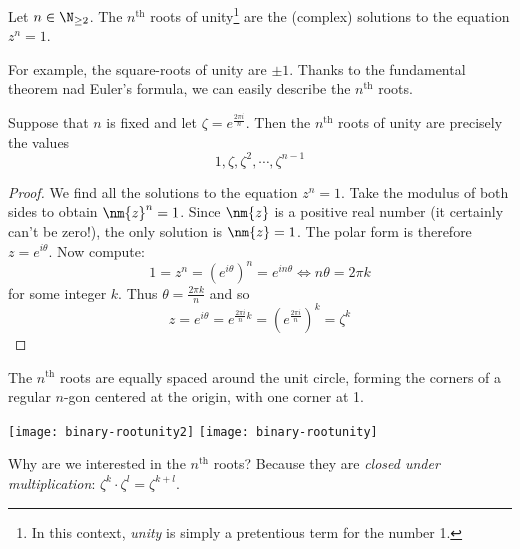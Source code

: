 
\begin{defn}
Let $n\in\N_{\ge 2}$. The $n^\text{th}$ roots of unity\footnote{In this context, \emph{unity} is simply a pretentious term for the number 1.} are the (complex) solutions to the equation $z^n=1$.
\end{defn}

For example, the square-roots of unity are $\pm 1$. Thanks to the fundamental theorem nad Euler's formula, we can easily describe the $n^\text{th}$ roots.

\begin{thm}
Suppose that $n$ is fixed and let $\zeta=e^{\frac{2\pi i}n}$. Then the $n^\text{th}$ roots of unity are precisely the values
\[1,\zeta,\zeta^2,\cdots,\zeta^{n-1}\]
\end{thm}

\begin{proof}
We find all the solutions to the equation $z^n=1$. Take the modulus of both sides to obtain $\nm{z}^n=1$. Since $\nm{z}$ is a positive real number (it certainly can't be zero!), the only solution is $\nm{z}=1$. The polar form is therefore $z=e^{i\theta}$. Now compute:
\[1=z^n=(e^{i\theta})^n=e^{in\theta}\iff n\theta=2\pi k\]
for some integer $k$. Thus $\theta=\frac{2\pi k}n$ and so
\[z=e^{i\theta}=e^{\frac{2\pi i}nk}=\left(e^{\frac{2\pi i}n}\right)^k=\zeta^k\tag*{\qedhere}\]
\end{proof}

The $n^\text{th}$ roots are equally spaced around the unit circle, forming the corners of a regular $n$-gon centered at the origin, with one corner at 1.

\begin{center}
\texttt{[image: binary-rootunity2]}
\qquad\qquad\qquad
\texttt{[image: binary-rootunity]}
\end{center}

Why are we interested in the $n^\text{th}$ roots? Because they are \emph{closed under multiplication}: $\displaystyle\zeta^k\cdot\zeta^l=\zeta^{k+l}$.


